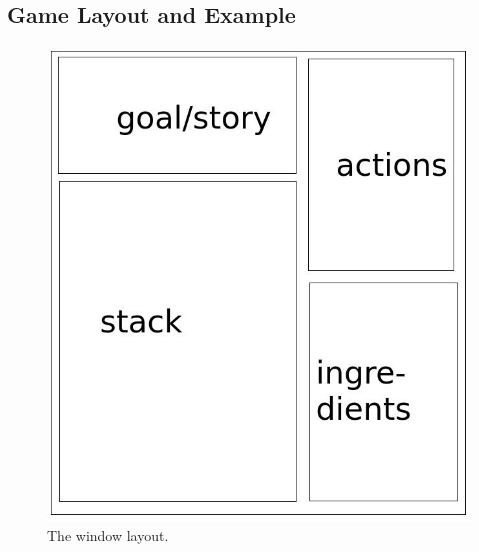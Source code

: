 \documentclass{sig-alternate}
\begin{document}
\subsection{Game Layout and Example}
\begin{figure}[h!]
  \centering
    \includegraphics[scale=.3]{layout.jpeg}
  \caption{The window layout.}
  \label{fig:layout}
\end{figure}
\end{document}
